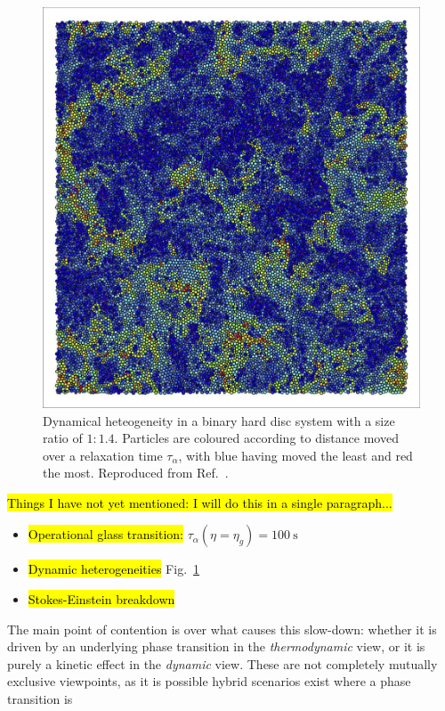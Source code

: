 \documentclass[11pt,twoside]{report}
\begin{document}
\begin{figure}
  \includegraphics[width=0.7\linewidth,outer]{dynamic-heterogeneity}
  \caption[Dynamical heterogeneity in binary hard discs]{
    Dynamical heteogeneity in a binary hard disc system with a size ratio of $1:1.4$.
    Particles are coloured according to distance moved over a relaxation time $\tau_\alpha$, with blue having moved the least and red the most.
    Reproduced from Ref.\ \cite{RoyallPR2015}.
  }
  \label{fig:dynamic-heterogeneities}
\end{figure}

\hl{Things I have not yet mentioned: I will do this in a single paragraph...}
\begin{itemize}
\item \hl{Operational glass transition:} $\tau_\alpha(\eta = \eta_g) = \SI{100}{\second}$
\item \hl{Dynamic heterogeneities} Fig.\ \ref{fig:dynamic-heterogeneities}
\item \hl{Stokes-Einstein breakdown}
\end{itemize}

The main point of contention is over what causes this slow-down: whether it is driven by an underlying phase transition in the \emph{thermodynamic} view, or it is purely a kinetic effect in the \emph{dynamic} view.
These are not completely mutually exclusive viewpoints, as it is possible hybrid scenarios exist where a phase transition is 

\end{document}
